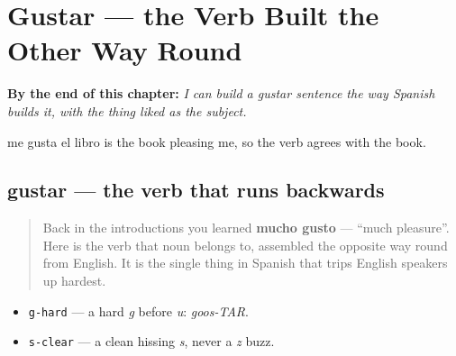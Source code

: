
\chapter{Gustar — the Verb Built the Other Way Round}
\label{ch:spanish-gustar}

\begin{chapteropening}
\textbf{By the end of this chapter:} \emph{I can build a gustar sentence the way Spanish builds it, with the thing liked as the subject.}

me gusta el libro is the book pleasing me, so the verb agrees with the book.
\end{chapteropening}

\section[gustar]{gustar — the verb that runs backwards}

\label{lesson:ES-C35-gustar}



\begin{quote}
Back in the introductions you learned \textbf{mucho gusto} — \textquotedblleft{}much pleasure\textquotedblright{}. Here is the verb that noun belongs to, assembled the opposite way round from English. It is the single thing in Spanish that trips English speakers up hardest.
\end{quote}

\begin{sounds}
\begin{itemize}
\raggedright
  \item \texttt{g-hard} — a hard \emph{g} before \emph{u}: \emph{goos-TAR}.
  \item \texttt{s-clear} — a clean hissing \emph{s}, never a \emph{z} buzz.
\end{itemize}
\end{sounds}

